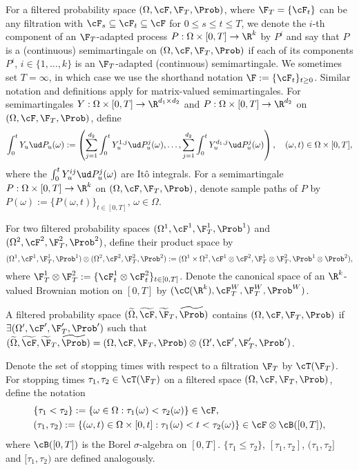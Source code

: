 \documentclass[11pt]{article}
\begin{document}
\begin{notation}

For a filtered probability space $(\Omega, \cF, \F_T, \Prob)$, where $\F_T = \{ \cF_t \}$ can be any filtration with $\cF_s \subseteq \cF_t \subseteq \cF$ for $0 \leq s \leq t \leq T$, we denote the $i$-th component of an $\F_T$-adapted process $P: \Omega \times [0,T] \to \R^k$ by $P^i$ and say that $P$ is a (continuous) semimartingale on $(\Omega, \cF, \F_T, \Prob)$ if each of its components $P^i$, $i \in \{1, \ldots, k\}$ is an $\F_T$-adapted (continuous) semimartingale. We sometimes set $T = \infty$, in which case we use the shorthand notation $\F := \{\cF_t\}_{t \geq 0}$. Similar notation and definitions apply for matrix-valued semimartingales. For semimartingales $Y: \Omega \times [0, T] \to \R^{d_1 \times d_2}$ and $P: \Omega \times [0, T] \to \R^{d_2}$ on $(\Omega, \cF, \F_T, \Prob)$, define
$$
\int_0^t Y_u \ud P_u(\omega) := \left( \sum_{j = 1}^{d_2} \int_0^t Y^{1,j}_u \ud P^j_u (\omega), \ldots, \sum_{j = 1}^{d_2} \int_0^t Y^{d_1,j}_u \ud P^j_u (\omega) \right), \quad (\omega, t) \in \Omega \times [0,T],
$$
where the $\int_0^t Y^{ij}_u \ud P^j_u (\omega)$ are It\^o integrals. For a semimartingale $P: \Omega \times [0,T] \to \R^k$ on $(\Omega, \cF, \F_T, \Prob)$, denote sample paths of $P$ by $P(\omega) := \{ P(\omega, t) \}_{t \in [0,T]}$, $\omega \in \Omega$.

For two filtered probability spaces $(\Omega^1, \cF^1, \F^1_T, \Prob^1)$ and $(\Omega^2, \cF^2, \F^2_T, \Prob^2)$, define their product space by
$$
(\Omega^1, \cF^1, \F^1_T, \Prob^1) \otimes (\Omega^2, \cF^2, \F^2_T, \Prob^2) := (\Omega^1 \times \Omega^2, \cF^1 \otimes \cF^2, \F^1_T \otimes \F^2_T, \Prob^1 \otimes \Prob^2),
$$
where $\F^1_T \otimes \F^2_T := \{ \cF^1_t \otimes \cF^2_t \}_{t \in [0,T]}$. Denote the canonical space of an $\R^k$-valued Brownian motion on $[0,T]$ by $(\cC(\R^k), \cF^W_T, \F^W_T,\Prob^W)$.

A filtered probability space $(\widetilde{\Omega},\widetilde{\cF},\widetilde{\F}_T,\widetilde{\Prob})$ contains $(\Omega, \cF, \F_T, \Prob)$ if $\exists (\Omega^\prime, \cF^\prime, \F^\prime_T, \Prob^\prime)$ such that $(\widetilde{\Omega},\widetilde{\cF},\widetilde{\F}_T,\widetilde{\Prob}) = (\Omega, \cF, \F_T, \Prob) \otimes (\Omega^\prime, \cF^\prime, \F^\prime_T, \Prob^\prime)$.

Denote the set of stopping times with respect to a filtration $\F_T$ by $\cT(\F_T)$. For stopping times $\tau_1, \tau_2 \in \cT(\F_T)$ on a filtered space $(\Omega, \cF, \F_T, \Prob)$, define the notation
\begin{align*}
&\{ \tau_1 < \tau_2 \} := \{ \omega \in \Omega : \tau_1(\omega) < \tau_2(\omega) \} \in \cF, \\
&(\tau_1, \tau_2) := \{ (\omega, t) \in \Omega \times [0,t] : \tau_1(\omega) < t < \tau_2(\omega) \} \in \cF \otimes \cB([0,T]),
\end{align*}
where $\cB([0,T])$ is the Borel $\sigma$-algebra on $[0,T]$. $\{\tau_1 \leq \tau_2 \}$, $[\tau_1, \tau_2]$, $(\tau_1, \tau_2]$ and $[\tau_1, \tau_2)$ are defined analogously.


\end{notation}
\end{document}
